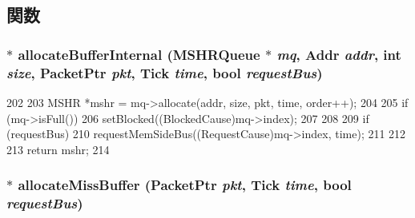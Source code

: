 \subsection{関数}
\hypertarget{classBaseCache_a2183a3718ac71defa0314e7030c4bfe5}{
\subsubsection[{allocateBufferInternal}]{$\ast$ allocateBufferInternal ({\bf MSHRQueue} $\ast$ {\em mq}, \/  {\bf Addr} {\em addr}, \/  int {\em size}, \/  {\bf PacketPtr} {\em pkt}, \/  {\bf Tick} {\em time}, \/  bool {\em requestBus})}}
\label{classBaseCache_a2183a3718ac71defa0314e7030c4bfe5}



\begin{DoxyCode}
202     {
203         MSHR *mshr = mq->allocate(addr, size, pkt, time, order++);
204 
205         if (mq->isFull()) {
206             setBlocked((BlockedCause)mq->index);
207         }
208 
209         if (requestBus) {
210             requestMemSideBus((RequestCause)mq->index, time);
211         }
212 
213         return mshr;
214     }
\end{DoxyCode}
\hypertarget{classBaseCache_ac37432bbe5fab7cdf422ee29acf155f2}{
\subsubsection[{allocateMissBuffer}]{$\ast$ allocateMissBuffer ({\bf PacketPtr} {\em pkt}, \/  {\bf Tick} {\em time}, \/  bool {\em requestBus})}}
\label{classBaseCache_ac37432bbe5fab7cdf422ee29acf155f2}




